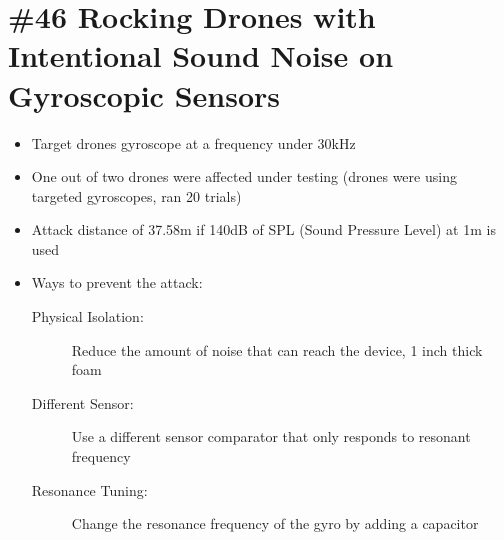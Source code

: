 \section{\#46 Rocking Drones with Intentional Sound Noise on Gyroscopic Sensors}
\begin{itemize}
	\item Target drones gyroscope at a frequency under 30kHz
	\item One out of two drones were affected under testing (drones were using targeted gyroscopes, ran 20 trials)
	\item Attack distance of 37.58m if 140dB of SPL (Sound Pressure Level) at 1m is used
	\item Ways to prevent the attack:
	\begin{description}
		\item[Physical Isolation:] Reduce the amount of noise that can reach the device, 1 inch thick foam
		\item[Different Sensor:] Use a different sensor comparator that only responds to resonant frequency
		\item[Resonance Tuning:] Change the resonance frequency of the gyro by adding a capacitor
	\end{description}
\end{itemize}